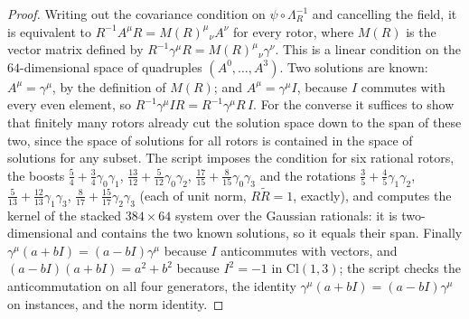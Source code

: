 \documentclass[11pt]{article}
\theoremstyle{definition}
\newcommand{\Cl}{\mathrm{Cl}}
\begin{document}
\begin{proof}
Writing out the covariance condition on $\psi \circ \Lambda_{R}^{-1}$ and cancelling the field, it is equivalent to $R^{-1}A^{\mu}R = M(R)^{\mu}{}_{\nu}A^{\nu}$ for every rotor, where $M(R)$ is the vector matrix defined by $R^{-1}\gamma^{\mu}R = M(R)^{\mu}{}_{\nu}\gamma^{\nu}$. This is a linear condition on the $64$-dimensional space of quadruples $(A^{0}, \dots, A^{3})$. Two solutions are known: $A^{\mu} = \gamma^{\mu}$, by the definition of $M(R)$; and $A^{\mu} = \gamma^{\mu}I$, because $I$ commutes with every even element, so $R^{-1}\gamma^{\mu}IR = R^{-1}\gamma^{\mu}R\,I$. For the converse it suffices to show that finitely many rotors already cut the solution space down to the span of these two, since the space of solutions for all rotors is contained in the space of solutions for any subset. The script imposes the condition for six rational rotors, the boosts $\tfrac54 + \tfrac34\gamma_{0}\gamma_{1}$, $\tfrac{13}{12} + \tfrac{5}{12}\gamma_{0}\gamma_{2}$, $\tfrac{17}{15} + \tfrac{8}{15}\gamma_{0}\gamma_{3}$ and the rotations $\tfrac35 + \tfrac45\gamma_{1}\gamma_{2}$, $\tfrac{5}{13} + \tfrac{12}{13}\gamma_{1}\gamma_{3}$, $\tfrac{8}{17} + \tfrac{15}{17}\gamma_{2}\gamma_{3}$ (each of unit norm, $R\tilde{R} = 1$, exactly), and computes the kernel of the stacked $384 \times 64$ system over the Gaussian rationals: it is two-dimensional and contains the two known solutions, so it equals their span. Finally $\gamma^{\mu}(a + bI) = (a - bI)\gamma^{\mu}$ because $I$ anticommutes with vectors, and $(a - bI)(a + bI) = a^{2} + b^{2}$ because $I^{2} = -1$ in $\Cl(1,3)$; the script checks the anticommutation on all four generators, the identity $\gamma^{\mu}(a+bI) = (a-bI)\gamma^{\mu}$ on instances, and the norm identity.
\end{proof}
\end{document}

